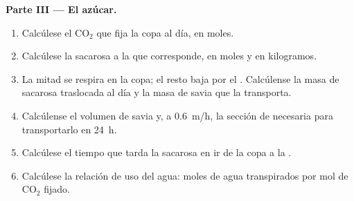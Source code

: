 \begin{problem}
\medskip
\noindent\textbf{Parte III --- El azúcar.}
\begin{enumerate}[resume]
  \item Calcúlese el $\mathrm{CO_2}$ que fija la copa al día, en moles.
  \item Calcúlese la sacarosa a la que corresponde, en moles y en
        kilogramos.
  \item La mitad se respira en la copa; el resto baja por el .
        Calcúlense la masa de sacarosa traslocada al día y la masa de savia
        que la transporta.
  \item Calcúlense el volumen de savia y, a \qty{0.6}{m/h}, la sección de
         necesaria para transportarlo en \qty{24}{h}.
  \item Calcúlese el tiempo que tarda la sacarosa en ir de la copa a la
        .
  \item Calcúlese la relación de uso del agua: moles de agua transpirados
        por mol de $\mathrm{CO_2}$ fijado.
\end{enumerate}


\end{problem}
